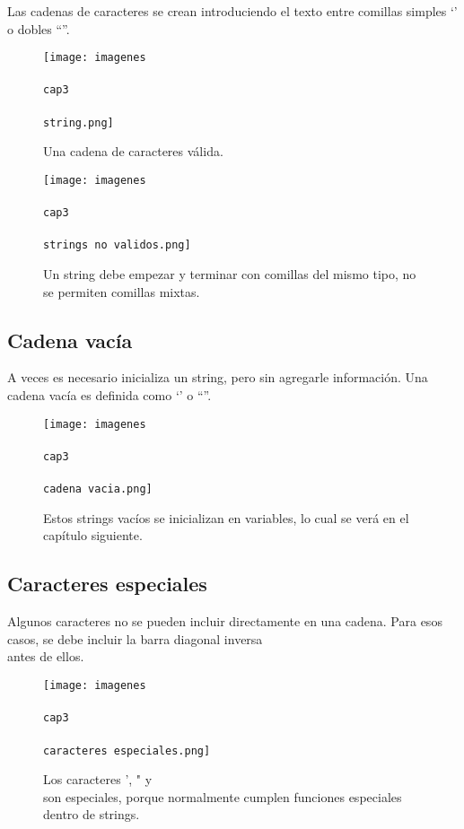 \documentclass{article}
\newcommand{\simple}[1]{`#1'}
\newcommand{\doble}[1]{``#1''}
\begin{document}
Las cadenas de caracteres se crean introduciendo el texto entre comillas simples \simple{} o dobles \doble{}.

\begin{figure}[ht!]
  \texttt{[image: imagenes\\\\cap3\\\\string.png]}
  \caption{Una cadena de caracteres válida.}
\end{figure}

\begin{figure}[ht!]
  \texttt{[image: imagenes\\\\cap3\\\\strings no validos.png]}
  \caption{Un string debe empezar y terminar con comillas del mismo tipo, no se permiten comillas mixtas.}
\end{figure}

\subsection{Cadena vacía}

A veces es necesario inicializa un string, pero sin agregarle información. Una cadena vacía es definida como \simple{} o \doble{}.

\begin{figure}[ht!]
  \texttt{[image: imagenes\\\\cap3\\\\cadena vacia.png]}
  \caption{Estos strings vacíos se inicializan en variables, lo cual se verá en el capítulo siguiente.}
\end{figure}

\subsection{Caracteres especiales}

Algunos caracteres no se pueden incluir directamente en una cadena. Para esos casos, se debe incluir la barra diagonal inversa \\ antes de ellos.

\begin{figure}[ht!]
  \texttt{[image: imagenes\\\\cap3\\\\caracteres especiales.png]}
  \caption{Los caracteres ', " y \\ son especiales, porque normalmente cumplen funciones especiales dentro de strings.}
\end{figure}
\end{document}
